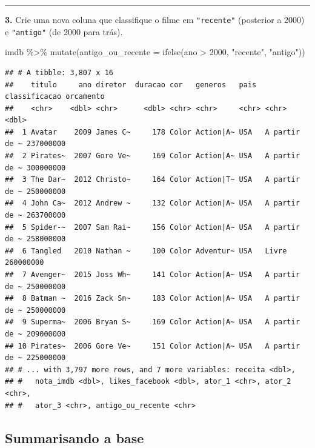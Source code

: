 \documentclass[
]{book}
\newenvironment{Shaded}{\begin{snugshade}}{\end{snugshade}}
\newcommand{\AttributeTok}[1]{\textcolor[rgb]{0.77,0.63,0.00}{#1}}
\newcommand{\DecValTok}[1]{\textcolor[rgb]{0.00,0.00,0.81}{#1}}
\newcommand{\FunctionTok}[1]{\textcolor[rgb]{0.00,0.00,0.00}{#1}}
\newcommand{\NormalTok}[1]{#1}
\newcommand{\SpecialCharTok}[1]{\textcolor[rgb]{0.00,0.00,0.00}{#1}}
\newcommand{\StringTok}[1]{\textcolor[rgb]{0.31,0.60,0.02}{#1}}
\begin{document}
\begin{center}\rule{0.5\linewidth}{0.5pt}\end{center}

\textbf{3.} Crie uma nova coluna que classifique o filme em \texttt{"recente"} (posterior a 2000) e \texttt{"antigo"} (de 2000 para trás).

\begin{Shaded}
\begin{Highlighting}[]
\NormalTok{imdb }\SpecialCharTok{\%\textgreater{}\%} 
  \FunctionTok{mutate}\NormalTok{(}\AttributeTok{antigo\_ou\_recente =} \FunctionTok{ifelse}\NormalTok{(ano }\SpecialCharTok{\textgreater{}} \DecValTok{2000}\NormalTok{, }\StringTok{"recente"}\NormalTok{, }\StringTok{"antigo"}\NormalTok{))}
\end{Highlighting}
\end{Shaded}

\begin{verbatim}
## # A tibble: 3,807 x 16
##    titulo     ano diretor  duracao cor   generos   pais  classificacao orcamento
##    <chr>    <dbl> <chr>      <dbl> <chr> <chr>     <chr> <chr>             <dbl>
##  1 Avatar    2009 James C~     178 Color Action|A~ USA   A partir de ~ 237000000
##  2 Pirates~  2007 Gore Ve~     169 Color Action|A~ USA   A partir de ~ 300000000
##  3 The Dar~  2012 Christo~     164 Color Action|T~ USA   A partir de ~ 250000000
##  4 John Ca~  2012 Andrew ~     132 Color Action|A~ USA   A partir de ~ 263700000
##  5 Spider-~  2007 Sam Rai~     156 Color Action|A~ USA   A partir de ~ 258000000
##  6 Tangled   2010 Nathan ~     100 Color Adventur~ USA   Livre         260000000
##  7 Avenger~  2015 Joss Wh~     141 Color Action|A~ USA   A partir de ~ 250000000
##  8 Batman ~  2016 Zack Sn~     183 Color Action|A~ USA   A partir de ~ 250000000
##  9 Superma~  2006 Bryan S~     169 Color Action|A~ USA   A partir de ~ 209000000
## 10 Pirates~  2006 Gore Ve~     151 Color Action|A~ USA   A partir de ~ 225000000
## # ... with 3,797 more rows, and 7 more variables: receita <dbl>,
## #   nota_imdb <dbl>, likes_facebook <dbl>, ator_1 <chr>, ator_2 <chr>,
## #   ator_3 <chr>, antigo_ou_recente <chr>
\end{verbatim}

\hypertarget{summarisando-a-base-1}{%
\subsection*{Summarisando a base}\label{summarisando-a-base-1}}
\end{document}
